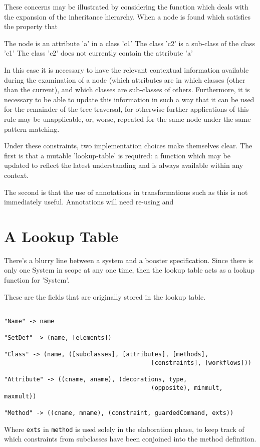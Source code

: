 These concerns may be illustrated by considering the function which
deals with the expansion of the inheritance hierarchy.  When a node is
found which satisfies the property that

The node is an attribute 'a' in a class 'c1'
The class 'c2' is a sub-class of the class 'c1'
The class 'c2' does not currently contain the attribute 'a'

In this case it is necessary to have the relevant contextual
information available during the examination of a node (which
attributes are in which classes (other than the current), and which
classes are sub-classes of others.  Furthermore, it is necessary to be
able to update this information in such a way that it can be used for
the remainder of the tree-traversal, for otherwise further
applications of this rule may be unapplicable, or, worse, repeated for
the same node under the same pattern matching.

Under these constraints, two implementation choices make themselves
clear.  The first is that a mutable 'lookup-table' is required: a
function which may be updated to reflect the latest understanding and
is always available within any context.

The second is that the use of annotations in transformations such as
this is not immediately useful.  Annotations will need re-using and  
 




\section{A Lookup Table}

There's a blurry line between a system and a booster specification.
Since there is only one System in scope at any one time, then the
lookup table acts as a lookup function for 'System'.

These are the fields that are originally stored in the lookup table.

\begin{verbatim}

"Name" -> name

"SetDef" -> (name, [elements])

"Class" -> (name, ([subclasses], [attributes], [methods], 
                                         [constraints], [workflows]))

"Attribute" -> ((cname, aname), (decorations, type, 
                                         (opposite), minmult, maxmult)) 

"Method" -> ((cname, mname), (constraint, guardedCommand, exts))

\end{verbatim}

Where \verb|exts| in \verb|method| is used solely in the elaboration
phase, to keep track of which constraints from subclasses have been
conjoined into the method definition.

